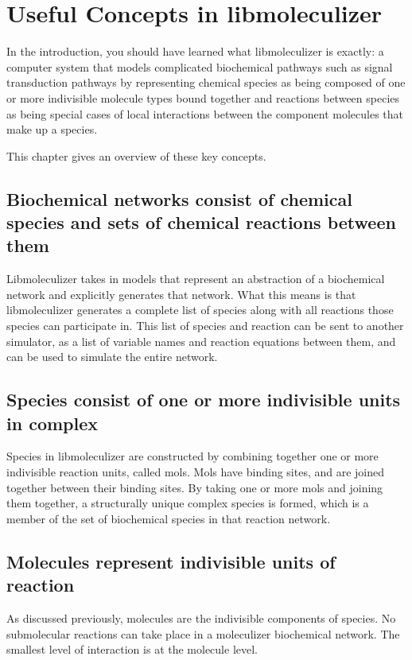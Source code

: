 \chapter{Useful Concepts in libmoleculizer}
\label{chap:conceptualOverviewChapter}

In the introduction, you should have learned what libmoleculizer is
exactly: a computer system that models complicated biochemical
pathways such as signal transduction pathways by representing chemical
species as being composed of one or more indivisible molecule types
bound together and reactions between species as being special cases of
local interactions between the component molecules that make up a
species.  

This chapter gives an overview of these key concepts.  

\section{Biochemical networks consist of chemical species and sets of
  chemical  reactions between them}
Libmoleculizer takes in models that represent an abstraction of a
biochemical network and explicitly generates that network.  What this
means is that libmoleculizer generates a complete list of species
along with all reactions those species can participate in.  This list
of species and reaction can be sent to another simulator, as a list of
variable names and reaction equations between them, and can be used to
simulate the entire network.  

\section{Species consist of one or more indivisible units in complex}

Species in libmoleculizer are constructed by combining together one or
more indivisible reaction units, called mols.  Mols have binding
sites, and are joined together between their binding sites.  By taking
one or more mols and joining them together, a structurally unique
complex species is formed, which is a member of the set of biochemical
species in that reaction network.  

\section{Molecules represent indivisible units of reaction}
As discussed previously, molecules are the indivisible components of
species.  No submolecular reactions can take place in a moleculizer
biochemical network.  The smallest level of interaction is at the
molecule level.  

